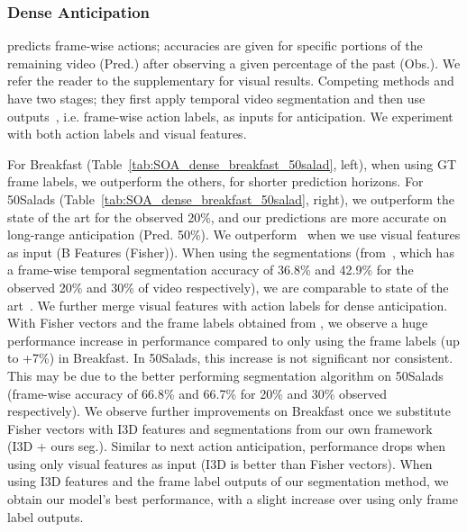 \documentclass[runningheads]{llncs}
\makeatletter
\newcommand*{\ie}{i.e.\@\xspace}
\makeatother
\begin{document}
\subsubsection{Dense Anticipation}\label{sec:dense_ant}
predicts frame-wise actions; accuracies are given for specific portions of the remaining video (Pred.) after observing a given percentage of the past (Obs.). We refer the reader to the supplementary for visual results. Competing methods \cite{abu2018will} and \cite{Ke_2019_CVPR} have two stages; they first apply temporal video segmentation and then use outputs~\cite{richard2017weakly}, \ie frame-wise action labels, as inputs for anticipation. We experiment with both action labels and visual features. 

For Breakfast (Table~\ref{tab:SOA_dense_breakfast_50salad}, left), when using GT frame labels, we outperform the others, for shorter prediction horizons. For 50Salads (Table~\ref{tab:SOA_dense_breakfast_50salad}, right), we outperform the state of the art for the observed 20\%, and our predictions are more accurate on long-range anticipation (Pred. 50\%). We outperform~\cite{abu2018will} when we use visual features as input (B Features (Fisher)). When using the segmentations (from~\cite{richard2017weakly}, which has a frame-wise temporal segmentation accuracy of 36.8\% and 42.9\% for the observed 20\% and 30\% of video respectively), we are comparable to state of the art~\cite{Ke_2019_CVPR}. We further merge visual features with action labels for dense anticipation. With Fisher vectors and the frame labels obtained from \cite{richard2017weakly}, we observe a huge performance increase in performance compared to only using the frame labels (up to +7\%) in Breakfast. In 50Salads, this increase is not significant nor consistent. This may be due to the better performing segmentation algorithm on 50Salads (frame-wise accuracy of 66.8\% and 66.7\% for 20\% and 30\% observed respectively). We observe further improvements on Breakfast once we substitute Fisher vectors with I3D features and  segmentations from our own framework (I3D + ours seg.). Similar to next action anticipation, performance drops when using only visual features as input (I3D is better than Fisher vectors). When using I3D features and the frame label outputs of our segmentation method, we obtain our model's best performance, with a slight increase over using only frame label outputs. 
  
\end{document}
